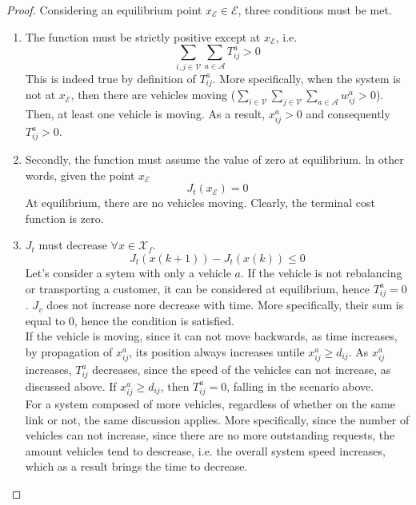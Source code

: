 \begin{proof}
 Considering an equilibrium point $x_{\mathcal{E}}\in\mathcal{E}$, three conditions must be met.\\
\begin{enumerate}
	\item The function must be strictly positive except at $x_{\mathcal{E}}$, i.e.
	\begin{equation*}
		\sum_{i,j \in \mathcal{V}}\sum_{a \in\mathcal{A}}T_{ij}^a >0
	\end{equation*}
	This is indeed true by definition of $T_{ij}^a$. More specifically, when the system is not at $x_{\mathcal{E}}$, then there are vehicles moving ($\sum_{i \in \mathcal{V}}\sum_{j \in \mathcal{V}}\sum_{a \in\mathcal{A}}w_{ij}^a >0$). Then, at least one vehicle is moving. As a result, $x_{ij}^a >0$ and consequently $T_{ij}^a>0$. \\
	\item Secondly, the function must assume the value of zero at equilibrium. ln other words, given the point $x_{\mathcal{E}}$
	\begin{equation*}
		J_t(x_{\mathcal{E}}) = 0
	\end{equation*}
	At equilibrium, there are no vehicles moving. Clearly, the terminal cost function is zero. 
	\item $J_t$ must decrease $\forall x \in \mathcal{X}_f$. 
	\begin{equation*}
		J_t(x(k+1)) - J_t(x(k))\leq 0
	\end{equation*}
	Let's consider a sytem with only a vehicle $a$. If the vehicle is not rebalancing or transporting a customer, it can be considered at equilibrium, hence $T^a_{ij} = 0$. $J_v$ does not increase nore decrease with time. More specifically, their sum is equal to 0, hence the condition is satisfied. \\
	If the vehicle is moving, since it can not move backwards, as time increases, by propagation of $x_{ij}^a$, its position always increases untile $x_{ij}^a \ge d_{ij}$. As $x_{ij}^a$ increases, $T_{ij}^a$ decreases, since the speed of the vehicles can not increase, as discussed above. If $x_{ij}^a \ge d_{ij}$, then $T_{ij}^a=0$, falling in the scenario above.\\
	For a system composed of more vehicles, regardless of whether on the same link or not, the same discussion applies. More specifically, since the number of vehicles can not increase, since there are no more outstanding requests, the amount vehicles tend to descrease, i.e. the overall system speed increases, which as a result brings the time to decrease. 
	

\end{enumerate}
\end{proof}

